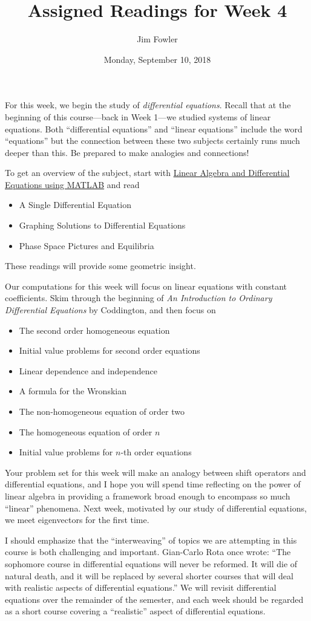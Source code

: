 \documentclass{homework}
\author{Jim Fowler}
\title{Assigned Readings for Week 4}
\date{Monday, September 10, 2018}
\begin{document}
\maketitle

For this week, we begin the study of \textit{differential equations}.
Recall that at the beginning of this course---back in Week 1---we
studied systems of linear equations.  Both ``differential equations''
and ``linear equations'' include the word ``equations'' but the
connection between these two subjects certainly runs much deeper than
this.  Be prepared to make analogies and connections!

To get an overview of the subject, start with
\href{/courses/43735/files/folder/textbooks}{Linear Algebra and
  Differential Equations using MATLAB} and read
\begin{itemize}
\item {} A Single Differential Equation
\item {} Graphing Solutions to Differential Equations
\item {} Phase Space Pictures and Equilibria
\end{itemize}
These readings will provide some geometric insight.

Our computations for this week will focus on linear equations with
constant coefficients.  Skim through the beginning of \textit{An
  Introduction to Ordinary Differential Equations} by Coddington, and
then focus on
\begin{itemize}
\item {} The second order homogeneous equation
\item {} Initial value problems for second order equations
\item {} Linear dependence and independence
\item {} A formula for the Wronskian
\item {} The non-homogeneous equation of order two
\item {} The homogeneous equation of order $n$
\item {} Initial value problems for $n$-th order equations
\end{itemize}

Your problem set for this week will make an analogy between shift
operators and differential equations, and I hope you will spend time
reflecting on the power of linear algebra in providing a framework
broad enough to encompass so much ``linear'' phenomena.  Next week,
motivated by our study of differential equations, we meet eigenvectors
for the first time.

I should emphasize that the ``interweaving'' of topics we are
attempting in this course is both challenging and
important. Gian-Carlo Rota once wrote: ``The sophomore course in
differential equations will never be reformed.  It will die of natural
death, and it will be replaced by several shorter courses that will
deal with realistic aspects of differential equations.''  We will revisit differential equations over the remainder of the semester, and each week should be regarded as a short course covering a ``realistic'' aspect of differential equations.
\end{document}
